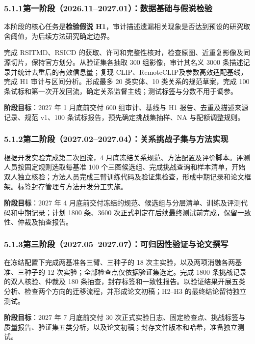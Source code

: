 \subsubsection*{5.1.1\quad 第一阶段（2026.11--2027.01）：数据基础与假说检验}

本阶段的核心任务是\textbf{检验假说 H1}，审计描述遗漏相关现象是否达到预设的研究取舍阈值，为后续方法研究确定边界。

完成 RSITMD、RSICD 的获取、许可和完整性核对，检查原图、近重复影像及同源切片，保持官方划分。从验证集各抽取 300 组影像，审计其名义 3000 条描述记录并统计去重后的有效信息量；复现 CLIP\cite{radford2021clip}、RemoteCLIP\cite{liu2024remoteclip}及参数高效适配\cite{yuan2023peft}基线，完成 H1 审计与区间分析。形成最多 20 类实体、10 类关系的规范草案，完成 100 条试标和第一次开发回流，确定关系监督主线；测试标签与分数不用于调参。

\textbf{阶段目标}：2027 年 1 月底前交付 600 组审计、基线与 H1 报告、去重及描述来源记录、规范 v1、100 条试标报告，预先确定挑战集抽样、NA 与配额调整规则。

\subsubsection*{5.1.2\quad 第二阶段（2027.02--2027.04）：关系挑战子集与方法实现}

根据开发实验完成第二次回流，4 月底冻结关系规范、方法配置及评价脚本。评测人员按固定规则选取每基准 100 个三图候选组、完成挑战查询和样本清单，开始双人独立核验；方法人员完成三臂训练代码及验证集检查，形成中期记录和论文框架。标签封存管理与方法开发分工实施。

\textbf{阶段目标}：2027 年 4 月底前交付冻结的规范、候选组与分层清单、训练及评测代码和中期记录；计划 1800 条、3600 次正式判定在后续最终测试前完成，保留一致性、仲裁及抽查报告。

\subsubsection*{5.1.3\quad 第三阶段（2027.05--2027.07）：可归因性验证与论文撰写}

在冻结配置下完成两基准各三臂、三种子的 18 次主实验，以及两项消融各两基准、三种子的 12 次实验；全部检查点仅依据验证集选定。完成 1800 条挑战记录的双人核验、仲裁及 180 条抽查，封存标签和一致性报告。以验证结果开展五类分析、检查两个方向的迁移流程，并形成论文初稿；H2--H3 的最终结论留待独立测试。

\textbf{阶段目标}：2027 年 7 月底前交付 30 次正式实验日志、固定检查点、挑战标签与质量报告、验证集五类分析，以及论文初稿；封存文件版本和哈希，准备独立测试。

